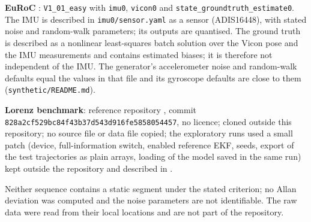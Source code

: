 \documentclass[11pt,a4paper]{article}
\begin{document}
\textbf{EuRoC} \citep{burri2016}: \texttt{V1\_01\_easy} with \texttt{imu0}, \texttt{vicon0} and
\texttt{state\_groundtruth\_estimate0}. The IMU is described in \texttt{imu0/sensor.yaml} as a sensor
(ADIS16448), with stated noise and random-walk parameters; its outputs are quantised. The ground
truth is described as a nonlinear least-squares batch solution over the Vicon pose and the IMU
measurements and contains estimated biases; it is therefore not independent of the IMU. The
generator's accelerometer noise and random-walk defaults equal the values in that file and its
gyroscope defaults are close to them (\texttt{synthetic/README.md}).

\textbf{Lorenz benchmark}: reference repository , commit
\texttt{828a2cf529bc84f43b37d543d916fe5858054457}, no licence; cloned outside this repository; no
source file or data file copied; the exploratory runs used a small patch (device, full-information
switch, enabled reference EKF, seeds, export of the test trajectories as plain arrays, loading of
the model saved in the same run) kept outside the repository and described in
.

Neither sequence contains a static segment under the stated criterion; no Allan deviation was
computed and the noise parameters are not identifiable. The raw data were read from their local
locations and are not part of the repository.

\end{document}
